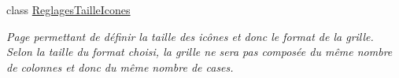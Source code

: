 \begin{DoxyCompactItemize}
class \hyperlink{class_my_domotik_1_1_reglages_taille_icones}{Reglages\+Taille\+Icones}
\begin{DoxyCompactList}\small\item\em Page permettant de définir la taille des icônes et donc le format de la grille. ~\newline
Selon la taille du format choisi, la grille ne sera pas composée du même nombre de colonnes et donc du même nombre de cases. \end{DoxyCompactList}\end{DoxyCompactItemize}
